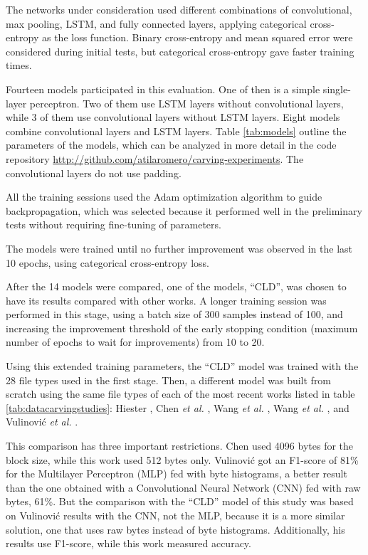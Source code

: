 The networks under consideration used different combinations of convolutional, max pooling, LSTM, and fully connected layers, applying categorical cross-entropy as the loss function. Binary cross-entropy and mean squared error were considered during initial tests, but categorical cross-entropy gave faster training times.

Fourteen models participated in this evaluation. One of then is a simple single-layer perceptron. Two of them use LSTM layers without convolutional layers, while 3 of them use convolutional layers without LSTM layers. Eight models combine convolutional layers and LSTM layers. Table \ref{tab:models} outline the parameters of the models, which can be analyzed in more detail in the code repository \sloppy\url{http://github.com/atilaromero/carving-experiments}. The convolutional layers do not use padding. 



All the training sessions used the Adam \cite{kingma_adam:_2014}
optimization algorithm to guide backpropagation, which was selected because it performed well in the preliminary tests without requiring fine-tuning of parameters.

The models were trained until no further improvement was observed in the last 10 epochs, using categorical cross-entropy loss.

After the 14 models were compared, one of the models, ``CLD'', was chosen to have its results compared with other works. A longer training session was performed in this stage, using a batch size of 300 samples instead of 100, and increasing the improvement threshold of the early stopping condition (maximum number of epochs to wait for improvements) from 10 to 20.

Using this extended training parameters, the ``CLD'' model was trained with the 28 file types used in the first stage. Then, a different model was built from scratch using the same file types of each of the most recent works listed in table \ref{tab:datacarvingstudies}: 
Hiester \cite{hiester_file_2018}, 
Chen \textit{et al.} \cite{chen_file_2018},
Wang \textit{et al.} \cite{wang_sparse_2018},
Wang \textit{et al.} \cite{wang_file_2018},
and
Vulinović \textit{et al.} \cite{vulinovic_neural_2019}.

This comparison has three important restrictions.
Chen used 4096 bytes for the block size, while this work used 512 bytes only.
Vulinović got an F1-score of 81\% for the Multilayer Perceptron (MLP) fed with byte histograms, a better result than the one obtained with a Convolutional Neural Network (CNN) fed with raw bytes, 61\%. But the comparison with the ``CLD'' model of this study was based on Vulinović results with the CNN, not the MLP, because it is a more similar solution, one that uses raw bytes instead of byte histograms. Additionally, his results use F1-score, while this work measured accuracy. 

